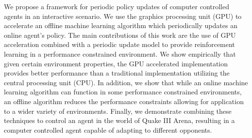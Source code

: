 \begin{umiabstract}
    We propose a framework for periodic policy updates of computer controlled agents in an interactive scenario. We use the graphics processing unit (GPU) to accelerate an offline machine learning algorithm which periodically updates an online agent's policy. The main contributions of this work are the use of GPU acceleration combined with a periodic update model to provide reinforcement learning in a performance constrained environment. We show empirically that given certain environment properties, the GPU accelerated implementation provides better performance than a traditional implementation utilizing the central processing unit (CPU). In addition, we show that while an online machine learning algorithm can function in some performance constrained environments, an offline algorithm reduces the performance constraints allowing for application to a wider variety of environments. Finally, we demonstrate combining these techniques to control an agent in the world of Quake III Arena, resulting in a computer controlled agent capable of adapting to different opponents.
\end{umiabstract}

\clearpage{}